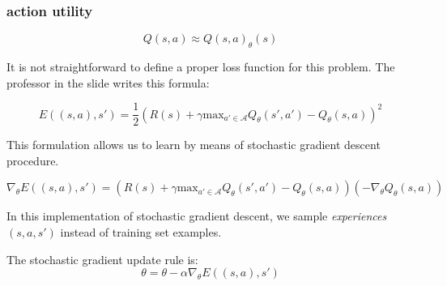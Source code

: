 \subsubsection{action utility}
\begin{equation}
    Q(s,a) \approx Q(s,a)_\theta(s)
\end{equation}

It is not straightforward to define a proper loss function for this problem. The professor in the slide writes this formula:

\begin{equation}
    E((s,a),s') = \frac{1}{2} (R(s) + \gamma \text{max}_{a' \in \mathcal{A}} Q_{\theta} (s', a') - Q_{\theta}(s,a))^2
\end{equation}

This formulation allows us to learn by means of stochastic gradient descent procedure.

\begin{equation}
    \nabla_{\theta} E((s,a),s') = (R(s) + \gamma \text{max}_{a' \in \mathcal{A}} Q_{\theta} (s', a') - Q_{\theta}(s,a)) (- \nabla_{\theta}Q_{\theta}(s,a))
\end{equation}

In this implementation of stochastic gradient descent, we sample \textit{experiences} $(s,a,s')$ instead of training set examples. \newline

The stochastic gradient update rule is:
\begin{equation}
    \theta = \theta - \alpha \nabla_{\theta}E((s,a), s')
\end{equation}

